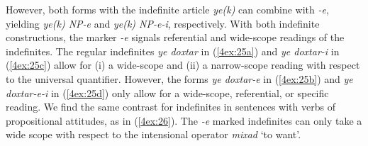 \documentclass[output=paper]{langsci/langscibook}
\begin{document}
However, both forms with the indefinite article {\emph{ye(k)}} can combine with {\emph{-e}}, yielding {\emph{ye(k) NP-e}} and {\emph{ye(k) NP-e-i}}, respectively. With both indefinite constructions, the marker {\emph{-e}} signals referential and wide-scope readings of the indefinites. The regular indefinites {\emph{ye doxtar}} in (\ref{4ex:25a}) and {\emph{ye doxtar-i}} in (\ref{4ex:25c}) allow for (i) a wide-scope and (ii) a narrow-scope reading with respect to the universal quantifier. However, the forms {\emph{ye doxtar-e}} in (\ref{4ex:25b}) and {\emph{ye doxtar-e-i}} in (\ref{4ex:25d}) only allow for a wide-scope, referential, or specific reading. We find the same contrast for indefinites in sentences with verbs of propositional attitudes, as in (\ref{4ex:26}). The {\emph{-e}} marked indefinites can only take a wide scope with respect to the intensional operator {\emph{mixad}} `to want'.
\end{document}
